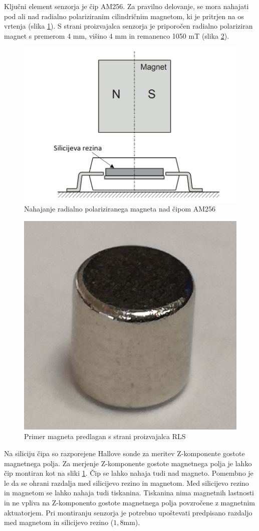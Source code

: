 Ključni element senzorja je čip AM256. Za pravilno delovanje, se mora nahajati pod ali nad radialno polariziranim cilindričnim magnetom, ki je pritrjen na os vrtenja (slika \ref{stranski_ris}).
S strani proizvajalca senzorja je priporočen radialno polariziran magnet s premerom 4 mm, višino 4 mm in remanenco 1050 mT (slika \ref{magnet4mm}).
\begin{figure}[ht]
	\centering
	\includegraphics[width=0.5\columnwidth]{./Slike/stranski_ris.png}
	\caption{Nahajanje radialno polariziranega magneta nad čipom AM256 \cite{AM8192}}
	\label{stranski_ris}
\end{figure}
\begin{figure}[ht]
	\centering
	\includegraphics[width=0.35\columnwidth]{./Slike/magnet4mm.png}
	\caption{Primer magneta predlagan s strani proizvajalca RLS}
	\label{magnet4mm}
\end{figure}

Na siliciju čipa so razporejene Hallove sonde za meritev Z-komponente gostote magnetnega polja. Za merjenje Z-komponente gostote magnetnega polja je lahko čip montiran kot na sliki \ref{stranski_ris}. Čip se lahko nahaja tudi nad magneto. Pomembno je le da se ohrani razdalja med silicijevo rezino in magnetom. Med silicijevo rezino in magnetom se lahko nahaja tudi tiskanina. Tiskanina nima magnetnih lastnosti in ne vpliva na Z-komponento gostote magnetnega polja povzročene z magnetnim aktuatorjem. Pri montiranju senzorja je potrebno upoštevati predpisano
razdaljo med magnetom in silicijevo rezino ($1,8 \mathrm{mm}$).

